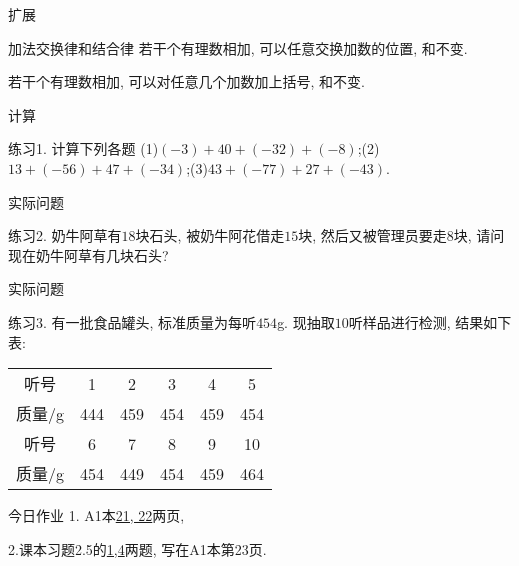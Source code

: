 \documentclass{beamer}
\begin{document}
\begin{frame}{扩展}
  \begin{block}{加法交换律和结合律}
     若干个有理数相加, 可以任意交换加数的位置, 和不变.\par
     若干个有理数相加, 可以对任意几个加数加上括号, 和不变.
  \end{block}
\end{frame}

\begin{frame}{计算}
  \begin{exampleblock}{练习1. 计算下列各题}
    (1)$(-3)+40+(-32)+(-8)$;\quad(2)$13+(-56)+47+(-34)$;\quad(3)$43+(-77)+27+(-43)$.
  \end{exampleblock}
\end{frame}

\begin{frame}{实际问题}
  \begin{exampleblock}{练习2.}
    奶牛阿草有$18$块石头, 被奶牛阿花借走$15$块, 然后又被管理员要走$8$块, 请问现在奶牛阿草有几块石头?
  \end{exampleblock}
\end{frame}

\begin{frame}{实际问题}
  \begin{exampleblock}{练习3.}
    有一批食品罐头, 标准质量为每听$454$g. 现抽取$10$听样品进行检测, 结果如下表:
    \begin{table}[htp]
      \centering
      \begin{tabular}{|c|c|c|c|c|c|}
        \toprule[1pt]
        听号&1&2&3&4&5\\
       质量/g &444&459&454&459&454\\
        \toprule[1pt]
        听号&6&7&8&9&10\\
        质量/g&454&449&454&459&464\\
        \toprule[1pt]
      \end{tabular}
    \end{table}
  \end{exampleblock}
\end{frame}


\begin{frame}{今日作业}
 \LARGE 1. A1本\underline{21, 22}两页, \par
      2.课本习题2.5的\underline{1,4}两题, 写在A1本第23页.
\end{frame}
\end{document}
